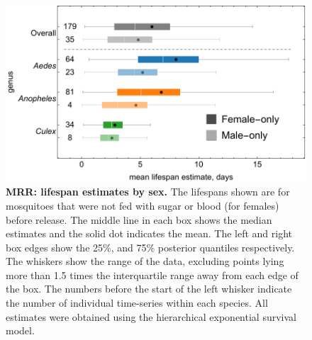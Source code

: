 \documentclass[12pt]{article}
\begin{document}
\begin{figure}[h]
	\centerline{\includegraphics[width=1\textwidth]{./Figure_files/mrr_sexDifferences_without_sugar_nor_blood.pdf}}
	\caption{\textbf{MRR: lifespan estimates by sex.} The lifespans shown are for mosquitoes that were not fed with sugar or blood (for females) before release. The middle line in each box shows the median estimates and the solid dot indicates the mean. The left and right box edges show the 25\%, and 75\% posterior quantiles respectively. The whiskers show the range of the data, excluding points lying more than 1.5 times the interquartile range away from each edge of the box. The numbers before the start of the left whisker indicate the number of individual time-series within each species. All estimates were obtained using the hierarchical exponential survival model.}
	\label{fig:mrr_sexDifferences_without_sugar_nor_blood}
\end{figure}
\end{document}
